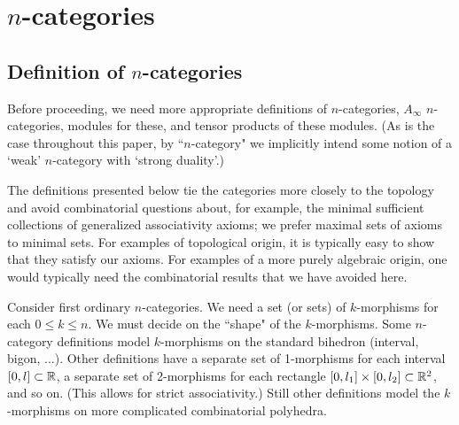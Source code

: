 
\def\xxpar#1#2{\smallskip\noindent{\bf #1} {\it #2} \smallskip}

\section{$n$-categories}
\label{sec:ncats}



\subsection{Definition of $n$-categories}

Before proceeding, we need more appropriate definitions of $n$-categories, 
$A_\infty$ $n$-categories, modules for these, and tensor products of these modules.
(As is the case throughout this paper, by ``$n$-category" we implicitly intend some notion of
a `weak' $n$-category with `strong duality'.)

The definitions presented below tie the categories more closely to the topology
and avoid combinatorial questions about, for example, the minimal sufficient
collections of generalized associativity axioms; we prefer maximal sets of axioms to minimal sets.
For examples of topological origin, it is typically easy to show that they
satisfy our axioms.
For examples of a more purely algebraic origin, one would typically need the combinatorial
results that we have avoided here.

\medskip

Consider first ordinary $n$-categories.
We need a set (or sets) of $k$-morphisms for each $0\le k \le n$.
We must decide on the ``shape" of the $k$-morphisms.
Some $n$-category definitions model $k$-morphisms on the standard bihedron (interval, bigon, ...).
Other definitions have a separate set of 1-morphisms for each interval $[0,l] \subset \mathbb{R}$, 
a separate set of 2-morphisms for each rectangle $[0,l_1]\times [0,l_2] \subset \mathbb{R}^2$,
and so on.
(This allows for strict associativity.)
Still other definitions 
model the $k$-morphisms on more complicated combinatorial polyhedra.

